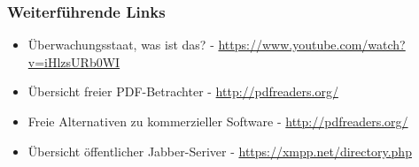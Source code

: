 \documentclass[12pt]{beamer}
\begin{document}
\begin{frame}
    \frametitle{Weiterführende Links}
    \begin{itemize}
        \item Überwachungsstaat, was ist das? - \url{https://www.youtube.com/watch?v=iHlzsURb0WI}
        \item Übersicht freier PDF-Betrachter - \url{http://pdfreaders.org/}
        \item Freie Alternativen zu kommerzieller Software - \url{http://pdfreaders.org/}
        \item Übersicht öffentlicher Jabber-Seriver - \url{https://xmpp.net/directory.php}
    \end{itemize}
\end{frame}
\end{document}
